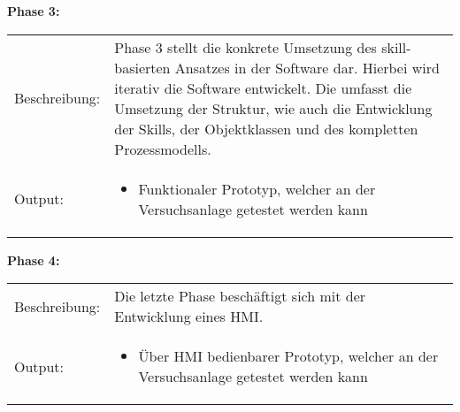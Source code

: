 	\textbf{Phase 3:} \vspace{2mm} 
	\\
		\begin{tabularx}{\textwidth}{@{}>{}p{7em} X@{}}
			Beschreibung: & 
			Phase 3 stellt die konkrete Umsetzung des skill-basierten Ansatzes in der Software dar. Hierbei wird iterativ die Software entwickelt. Die umfasst die Umsetzung der Struktur, wie auch die Entwicklung der Skills, der Objektklassen und des kompletten Prozessmodells.  
			\\
	
			Output: & 
			\begin{itemize}
				\item Funktionaler Prototyp, welcher an der Versuchsanlage getestet werden kann
			\end{itemize}
		\end{tabularx}
	
	\textbf{Phase 4:} \vspace{2mm} 
	\\
		\begin{tabularx}{\textwidth}{@{}>{}p{7em} X@{}}
			Beschreibung: & 
			Die letzte Phase beschäftigt sich mit der Entwicklung eines HMI.  
			\\
			
			Output: & 
			\begin{itemize}
				\item Über HMI bedienbarer Prototyp, welcher an der Versuchsanlage getestet werden kann
			\end{itemize}
		\end{tabularx}
	
	